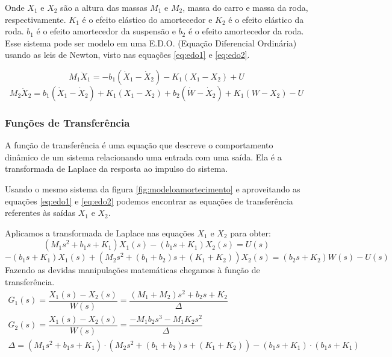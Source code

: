 Onde $X_1$ e $X_2$ são a altura das massas $M_1$ e $M_2$, massa do carro e massa da roda, respectivamente. $K_1$ é o efeito elástico do amortecedor e $K_2$ é o efeito elástico da roda. $b_1$ é o efeito amortecedor da suspensão e $b_2$ é o efeito amortecedor da roda.
Esse sistema pode ser modelo em uma E.D.O. (Equação Diferencial Ordinária) usando as leis de Newton, visto nas equações \eqref{eq:edo1} e \eqref{eq:edo2}.

\begin{equation} \label{eq:edo1}
M_1 \ddot{X}_1=-b_1(\dot{X}_1-\dot{X}_2) -K_1(X_1-X_2)+U
\end{equation}
\begin{equation} \label{eq:edo2}
M_2 \ddot{X}_2=b_1 (\dot{X}_1 -\dot{X}_2) +K_1(X_1-X_2) +b_2(\dot{W} -\dot{X}_2)+K_1(W-X_2) -U
\end{equation}

\subsubsection{Funções de Transferência}
A função de transferência é uma equação que descreve o comportamento dinâmico de um sistema relacionando uma entrada com uma saída. Ela é a transformada de Laplace da resposta ao impulso do sistema.

Usando o mesmo sistema da figura \ref{fig:modeloamortecimento} e aproveitando as equações \eqref{eq:edo1} e \eqref{eq:edo2} podemos encontrar as equações de transferência referentes às saídas $X_1$ e $X_2$.

Aplicamos a transformada de Laplace nas equações $X_1$ e $X_2$ para obter:
\begin{equation} \label{eq:e2121}
(M_1s^2+b_1s+K_1) X_1(s) -(b_1s+K_1) X_2(s)=U(s)
\end{equation}
\begin{equation} \label{eq:e2122}
-(b_1s+ K_1) X_1(s) +(M_2s^2 + (b_1 + b_2)s +(K_1 + K_2))X_2(s)=(b_2s +K_2) W(s)-U(s)
\end{equation}
Fazendo as devidas manipulações matemáticas chegamos à função de transferência.
\begin{equation}\label{eq:e2123}
\begin{array}{c}
G_1(s)=\dfrac{X_1(s)-X_2(s)}{W(s)}= \dfrac{(M_1+M_2)s^2+b_2s+K_2} {\Delta}
\\
G_2(s)=\dfrac{X_1(s)-X_2(s)}{W(s)}= \dfrac{-M_1b_2s^3-M_1K_2s^2}{\Delta}
\\
\Delta=(M_1s^2+b_1s+K_1)\cdot (M_2s^2+ (b_1+b_2)s+(K_1+K_2))-(b_1s+K_1)\cdot (b_1s+K_1)
\end{array}
\end{equation}

